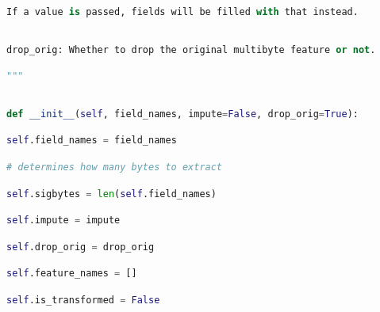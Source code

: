 \documentclass[
  11pt,
  a4paper,
  DIV=12,captions=tableheading,oneside]{scrbook}
\begin{document}
\begin{lstlisting}[language=Python,stepnumber=2,basicstyle=\footnotesize]
            If a value is passed, fields will be filled with that instead.\end{lstlisting}
\begin{lstlisting}[language=Python,stepnumber=2,basicstyle=\footnotesize]
\end{lstlisting}
\begin{lstlisting}[language=Python,stepnumber=2,basicstyle=\footnotesize]
    drop_orig: Whether to drop the original multibyte feature or not.\end{lstlisting}
\begin{lstlisting}[language=Python,stepnumber=2,basicstyle=\footnotesize]
    """\end{lstlisting}
\begin{lstlisting}[language=Python,stepnumber=2,basicstyle=\footnotesize]
\end{lstlisting}
\begin{lstlisting}[language=Python,stepnumber=2,basicstyle=\footnotesize]
    def __init__(self, field_names, impute=False, drop_orig=True):\end{lstlisting}
\begin{lstlisting}[language=Python,stepnumber=2,basicstyle=\footnotesize]
        self.field_names = field_names\end{lstlisting}
\begin{lstlisting}[language=Python,stepnumber=2,basicstyle=\footnotesize]
        # determines how many bytes to extract\end{lstlisting}
\begin{lstlisting}[language=Python,stepnumber=2,basicstyle=\footnotesize]
        self.sigbytes = len(self.field_names)\end{lstlisting}
\begin{lstlisting}[language=Python,stepnumber=2,basicstyle=\footnotesize]
        self.impute = impute\end{lstlisting}
\begin{lstlisting}[language=Python,stepnumber=2,basicstyle=\footnotesize]
        self.drop_orig = drop_orig\end{lstlisting}
\begin{lstlisting}[language=Python,stepnumber=2,basicstyle=\footnotesize]
        self.feature_names = []\end{lstlisting}
\begin{lstlisting}[language=Python,stepnumber=2,basicstyle=\footnotesize]
        self.is_transformed = False\end{lstlisting}
\end{document}
